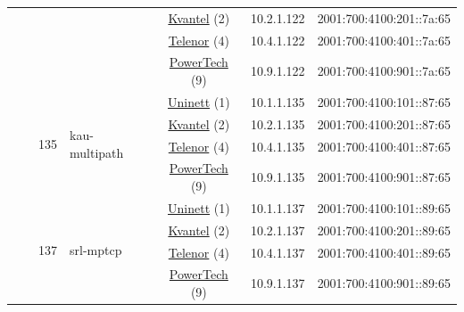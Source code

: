 \begin{small}
\begin{center}
\begin{longtable}{|c|c|c|c|c|c|c|c|}
  &  &  &  & \multicolumn{2}{|c|}{\tiny{\href{http://kvantel.no}{Kvantel} (2)}} & \tiny{10.2.1.122} & \tiny{2001:700:4100:201::7a:65} \\* \cline{5-5}\cline{6-6}\cline{7-7}\cline{8-8}
  &  &  &  & \multicolumn{2}{|c|}{\tiny{\href{https://www.telenor.no}{Telenor} (4)}} & \tiny{10.4.1.122} & \tiny{2001:700:4100:401::7a:65} \\* \cline{5-5}\cline{6-6}\cline{7-7}\cline{8-8}
  &  &  &  & \multicolumn{2}{|c|}{\tiny{\href{http://www.powertech.no}{PowerTech} (9)}} & \tiny{10.9.1.122} & \tiny{2001:700:4100:901::7a:65} \\* \cline{3-3}\cline{4-4}\cline{5-5}\cline{6-6}\cline{7-7}\cline{8-8}
  &  & \multirow{4}{*}{\tiny{135}} & \multicolumn{1}{|l|}{\multirow{4}{*}{\tiny{kau-multipath}}} & \multicolumn{2}{|c|}{\tiny{\href{https://www.uninett.no}{Uninett} (1)}} & \tiny{10.1.1.135} & \tiny{2001:700:4100:101::87:65} \\* \cline{5-5}\cline{6-6}\cline{7-7}\cline{8-8}
  &  &  &  & \multicolumn{2}{|c|}{\tiny{\href{http://kvantel.no}{Kvantel} (2)}} & \tiny{10.2.1.135} & \tiny{2001:700:4100:201::87:65} \\* \cline{5-5}\cline{6-6}\cline{7-7}\cline{8-8}
  &  &  &  & \multicolumn{2}{|c|}{\tiny{\href{https://www.telenor.no}{Telenor} (4)}} & \tiny{10.4.1.135} & \tiny{2001:700:4100:401::87:65} \\* \cline{5-5}\cline{6-6}\cline{7-7}\cline{8-8}
  &  &  &  & \multicolumn{2}{|c|}{\tiny{\href{http://www.powertech.no}{PowerTech} (9)}} & \tiny{10.9.1.135} & \tiny{2001:700:4100:901::87:65} \\* \cline{3-3}\cline{4-4}\cline{5-5}\cline{6-6}\cline{7-7}\cline{8-8}
  &  & \multirow{4}{*}{\tiny{137}} & \multicolumn{1}{|l|}{\multirow{4}{*}{\tiny{srl-mptcp}}} & \multicolumn{2}{|c|}{\tiny{\href{https://www.uninett.no}{Uninett} (1)}} & \tiny{10.1.1.137} & \tiny{2001:700:4100:101::89:65} \\* \cline{5-5}\cline{6-6}\cline{7-7}\cline{8-8}
  &  &  &  & \multicolumn{2}{|c|}{\tiny{\href{http://kvantel.no}{Kvantel} (2)}} & \tiny{10.2.1.137} & \tiny{2001:700:4100:201::89:65} \\* \cline{5-5}\cline{6-6}\cline{7-7}\cline{8-8}
  &  &  &  & \multicolumn{2}{|c|}{\tiny{\href{https://www.telenor.no}{Telenor} (4)}} & \tiny{10.4.1.137} & \tiny{2001:700:4100:401::89:65} \\* \cline{5-5}\cline{6-6}\cline{7-7}\cline{8-8}
  &  &  &  & \multicolumn{2}{|c|}{\tiny{\href{http://www.powertech.no}{PowerTech} (9)}} & \tiny{10.9.1.137} & \tiny{2001:700:4100:901::89:65} \\* \cline{3-3}\cline{4-4}\cline{5-5}\cline{6-6}\cline{7-7}\cline{8-8}

\end{longtable}
\end{center}
\end{small}
